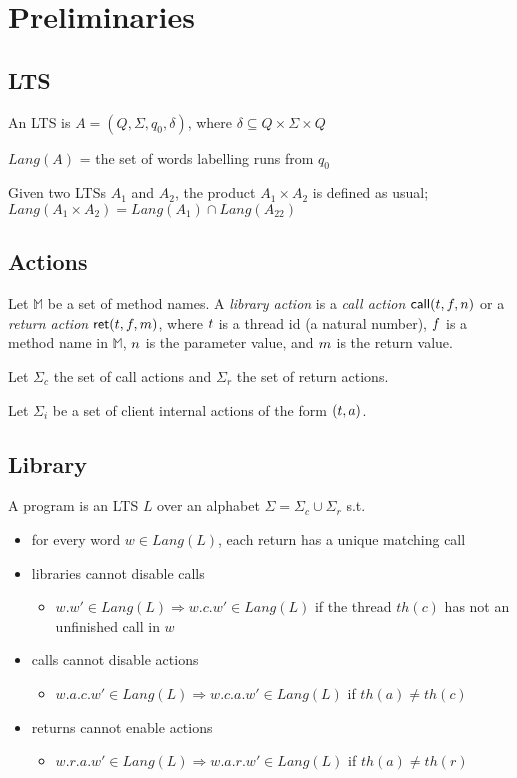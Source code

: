 \section{Preliminaries}

\subsection{LTS}

An LTS is $A = (Q,\Sigma,q_0,\delta)$, where $\delta \subseteq Q \times \Sigma \times Q$

$Lang(A)$ = the set of words labelling runs from $q_0$

Given two LTSs $A_1$ and $A_2$, the product $A_1 \times A_2$ is defined as usual; $Lang(A_1\times A_2) = Lang(A_1) \cap Lang(A_22)$

\subsection{Actions}

Let $\mathbb{M}$ be a set of method names. 
A \emph{library action} is a 
\emph {call action} ${\sf call}({t},{f},{n})$
or a \emph{return action} ${\sf ret}({t},{f},{m})$,
where $t$ is a thread id (\ie a natural number), $f$ is a method name in $\mathbb{M}$, $n$ is the parameter value,
and $m$ is the return value. 

Let $\Sigma_c$ the set of call actions and $\Sigma_r$ the set of return actions. 

Let $\Sigma_i$ be a set of client internal actions of the form $(t,a)$.

\subsection{Library}

A program is an LTS $L$ over an alphabet $\Sigma=\Sigma_c\cup \Sigma_r$ s.t.
\begin{itemize}
	\item for every word $w \in Lang(L)$, each return has a unique matching call
	\item libraries cannot disable calls
	\begin{itemize}
		\item $w.w'\in Lang(L)\Rightarrow w.c.w'\in Lang(L)$ if the thread $th(c)$ has not an unfinished call in $w$
    	\end{itemize}	
	\item calls cannot disable actions 
	\begin{itemize}
		\item $w.a.c.w' \in Lang(L) \Rightarrow w.c.a.w'\in Lang(L)$ if $th(a) \neq th(c)$
    	\end{itemize}
	\item returns cannot enable actions 
	\begin{itemize}
		\item $w.r.a.w'\in Lang(L)\Rightarrow w.a.r.w'\in Lang(L)$ if $th(a) \neq th(r)$
	\end{itemize}
\end{itemize}

